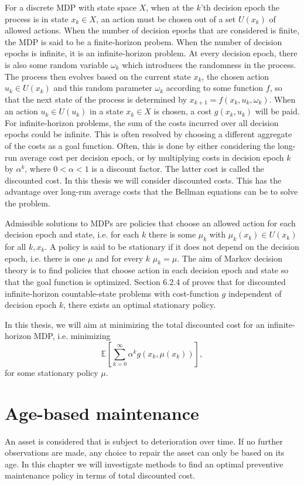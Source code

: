 \documentclass[a4paper]{thesis}
\theoremstyle{definition}
\begin{document}
For a discrete MDP with state space $X$, when at the $k$'th decision epoch the process is in state $x_k\in X$, an action must be chosen out of a set $U(x_k)$ of allowed actions.
When the number of decision epochs that are considered is finite, the MDP is said to be a finite-horizon probem.
When the number of decision epochs is infinite, it is an infinite-horizon problem.
At every decision epoch, there is also some random variable $\omega_k$ which introduces the randomness in the process.
The process then evolves based on the current state $x_k$, the chosen action $u_k\in U(x_k)$ and this random parameter $\omega_k$ according to some function $f$, so that the next state of the process is determined by $x_{k+1}=f(x_k,u_k,\omega_k)$.
When an action $u_k\in U(u_k)$ in a state $x_k\in X$ is chosen, a cost $g(x_k,u_k)$ will be paid.
For infinite-horizon problems, the sum of the costs incurred over all decision epochs could be infinite.
This is often resolved by choosing a different aggregate of the costs as a goal function.
Often, this is done by either considering the long-run average cost per decision epoch, or by multiplying costs in decision epoch $k$ by $\alpha^k$, where $0<\alpha<1$ is a discount factor.
The latter cost is called the discounted cost.
In this thesis we will consider discounted costs.
This has the advantage over long-run average costs that the Bellman equations can be to solve the problem.

Admissible solutions to MDPs are policies that choose an allowed action for each decision epoch and state, i.e. for each $k$ there is some $\mu_k$ with $\mu_k(x_k)\in U(x_k)$ for all $k,x_k$.
A policy is said to be stationary if it does not depend on the decision epoch, i.e. there is one $\mu$ and for every $k$ $\mu_k=\mu$.
The aim of Markov decision theory is to find policies that choose action in each decision epoch and state so that the goal function is optimized.
Section 6.2.4 of \cite{Puterman2008} proves that for discounted infinite-horizon countable-state problems with cost-function $g$ independent of decision epoch $k$, there exists an optimal stationary policy.

In this thesis, we will aim at minimizing the total discounted cost for an infinite-horizon MDP, i.e. minimizing
\[
\mathbb{E}\left[\sum\limits_{k=0}^\infty \alpha^k g(x_k,\mu(x_k))\right],
\]
for some stationary policy $\mu$. 


\chapter{Age-based maintenance}\label{chapter:AgeBased}
An asset is considered that is subject to deterioration over time.
If no further observations are made, any choice to repair the asset can only be based on its age.
In this chapter we will investigate methods to find an optimal preventive maintenance policy in terms of total discounted cost.
\end{document}
